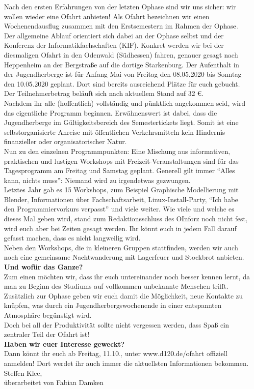 {Nach den ersten Erfahrungen von der letzten Ophase sind wir uns sicher: wir wollen wieder eine Ofahrt anbieten!}
{
Als Ofahrt bezeichnen wir einen Wochenendausflug zusammen mit den Erstsemestern im Rahmen der Ophase. Der allgemeine Ablauf orientiert sich dabei
an der Ophase selbst und der Konferenz der Informatikfachschaften (KIF).
Konkret werden wir bei der diesmaligen Ofahrt in den Odenwald (Südhessen) fahren, genauer gesagt nach Heppenheim an der Bergstraße auf die dortige Starkenburg. Der Aufenthalt in der Jugendherberge ist für Anfang Mai von Freitag den 08.05.2020 bis Sonntag den 10.05.2020 geplant.
Dort sind bereits ausreichend Plätze für euch gebucht. Der Teilnehmerbetrag beläuft sich nach aktuellem Stand auf 32 \euro.\\

Nachdem ihr alle (hoffentlich) vollständig und pünktlich angekommen seid, wird das eigentliche Programm beginnen. Erwähnenswert ist dabei, dass die Jugendherberge im Gültigkeitsbereich des Semestertickets liegt. Somit ist eine selbstorganisierte Anreise mit öffentlichen Verkehrsmitteln kein Hindernis finanzieller oder organisatorischer Natur.\\

Nun zu den einzelnen Programmpunkten:
Eine Mischung aus informativen, praktischen und lustigen Workshops mit Freizeit-Veranstaltungen sind für das Tagesprogramm am Freitag und Samstag geplant.
Generell gilt immer "`Alles kann, nichts muss"': Niemand wird zu irgendetwas gezwungen.\\

Letztes Jahr gab es 15 Workshops, zum Beispiel Graphische Modellierung mit Blender, Informationen über Fachschaftsarbeit, Linux-Install-Party, "`Ich habe den Programmiervorkurs verpasst"' und viele weiter. Wie viele und welche es dieses Mal geben wird, stand zum Redaktionsschluss des OInforz noch nicht fest, wird euch aber bei Zeiten gesagt werden. Ihr könnt euch in jedem Fall darauf gefasst machen, dass es nicht langweilig wird.\\

Neben den Workshops, die in kleineren Gruppen stattfinden, werden wir auch noch eine gemeinsame Nachtwanderung mit Lagerfeuer und Stockbrot anbieten.\\

\textbf{Und wofür das Ganze?}\\
Zum einen möchten wir, dass ihr euch untereinander noch besser kennen lernt, da man zu Beginn des Studiums auf vollkommen unbekannte Menschen trifft. Zusätzlich zur Ophase geben wir euch damit die Möglichkeit, neue Kontakte zu knüpfen, was durch ein Jugendherbergswochenende in einer entspannten Atmosphäre begünstigt wird.\\

Doch bei all der Produktivität sollte nicht vergessen werden, dass Spaß ein zentraler Teil der Ofahrt ist!\\

\textbf{Haben wir euer Interesse geweckt?}\\
Dann könnt ihr euch ab Freitag, 11.10., unter www.d120.de/ofahrt offiziell anmelden! Dort werdet ihr auch immer die aktuellsten Informationen bekommen.
}
{Steffen Klee, \\ überarbeitet von Fabian Damken}
\newpage
